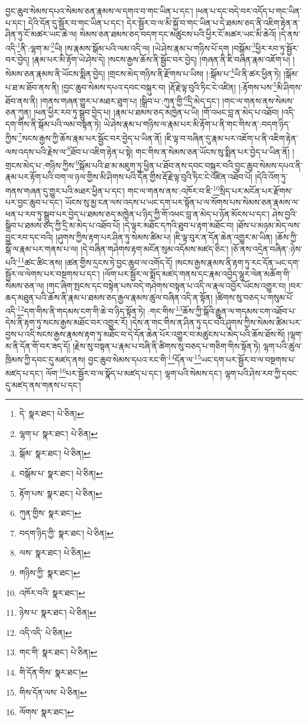 བྱང་ཆུབ་སེམས་དཔའ་སེམས་ཅན་རྣམས་ལ་དགའ་བ་གང་ཡིན་པ་དང་། །ཕན་པ་དང་བདེ་བར་འདོད་པ་གང་ཡིན་པ་དང་། དེའི་དོན་དུ་སྦྱོར་བ་གང་ཡིན་པ་དང་། དེར་སྦྱོར་བ་ལ་མི་སྐྱོ་བ་གང་ཡིན་པ་དེ་ཐམས་ཅད་ནི་འཇིག་རྟེན་ན་ཤིན་ཏུ་ངོ་མཚར་ཡང་ཆེ་ལ། སེམས་ཅན་ཐམས་ཅད་བདག་དང་མཚུངས་པའི་ཕྱིར་ངོ་མཚར་ཡང་མི་ཆེའོ། །དེ་ནས་འདི་\footnote{དེ་  སྣར་ཐང་།  པེ་ཅིན། }ནི་:ལྷག་མ་\footnote{ལྷག་པ་  སྣར་ཐང་།  པེ་ཅིན། }ཡི། །ས་རྣམས་སྒོམ་པའི་ལམ་འདི་ལ། །ཡེ་ཤེས་རྣམ་པ་གཉིས་པོ་དག །བསྒོམ་\footnote{སྒོམ་  སྣར་ཐང་།  པེ་ཅིན། }ཕྱིར་རབ་ཏུ་སྦྱོར་བར་བྱེད། །རྣམ་པར་མི་རྟོག་ཡེ་ཤེས་དེ། །སངས་རྒྱས་ཆོས་ནི་སྦྱོང་བར་བྱེད། །གཞན་ནི་ཇི་བཞིན་རྣམ་འཇོག་པ། །སེམས་ཅན་རྣམས་ནི་ཡོངས་སྨིན་བྱེད། །གྲངས་མེད་གཉིས་ནི་རྫོགས་པ་ཡིས། །:སྒོམ་པ་\footnote{བསྒོམ་པ་  སྣར་ཐང་།  པེ་ཅིན། }ཡི་ནི་ཚར་ཕྱིན་ཏེ། །སྒོམ་པ་ཐ་མ་ཐོབ་ནས་ནི། །བྱང་ཆུབ་སེམས་དཔའ་དབང་བསྐུར་བ། །རྡོ་རྗེ་ལྟ་བུའི་ཏིང་ངེ་འཛིན། །:རྟོགས་པས་\footnote{རྟོག་པས་  སྣར་ཐང་།  པེ་ཅིན། }མི་ཤིགས་ཐོབ་ནས་ནི། །གནས་གཞན་གྱུར་པ་མཐར་ཐུག་པ། །སྒྲིབ་པ་:ཀུན་གྱི་\footnote{ཀུན་གྱིས་  སྣར་ཐང་། }དྲི་མེད་དང་། །གང་ལ་གནས་ནས་སེམས་ཅན་ཀུན། །ཕན་ཕྱིར་རབ་ཏུ་སྒྲུབ་བྱེད་པ། །རྣམ་པ་ཐམས་ཅད་མཁྱེན་པ་ཡི། །གོ་འཕང་བླ་ན་མེད་པ་འཐོབ། །འདི་དག་གིས་ནི་སྒོམ་པའི་ལམ་བསྟན་ཏེ། ཡེ་ཤེས་རྣམ་པ་གཉིས་ལ་རྣམ་པར་མི་རྟོག་པ་ནི་གང་གིས་ན་:བདག་ཉིད་ཀྱིས་\footnote{བདག་ཉིད་ཀྱི་  སྣར་ཐང་།  པེ་ཅིན། }སངས་རྒྱས་ཀྱི་ཆོས་རྣམ་པར་སྦྱོང་བར་བྱེད་པ་ཡིན་ནོ། །ཇི་ལྟ་བ་བཞིན་དུ་རྣམ་པར་འཇོག་པ་ནི་འཇིག་རྟེན་ལས་འདས་པའི་རྗེས་ལ་\footnote{ལས་  སྣར་ཐང་།  པེ་ཅིན། }ཐོབ་པ་འཇིག་རྟེན་པ་སྟེ། གང་གིས་ན་སེམས་ཅན་ཡོངས་སུ་སྨིན་པར་བྱེད་པ་ཡིན་ནོ། །གྲངས་མེད་པ་:གཉིས་ཀྱིས་\footnote{གཉིས་ཀྱི་  སྣར་ཐང་། }སྒོམ་པའི་ཐ་མ་མཇུག་ཏུ་ཕྱིན་པ་ཐོབ་ནས་དབང་བསྐུར་བའི་བྱང་ཆུབ་སེམས་དཔའ་ནི་རྣམ་པར་རྟོག་པའི་བག་ལ་ཉལ་གྱིས་མི་ཤིགས་པའི་དོན་གྱིས་རྡོ་རྗེ་ལྟ་བུའི་ཏིང་ངེ་འཛིན་འཐོབ་པོ། །དེའི་འོག་ཏུ་གནས་གཞན་དུ་གྱུར་པའི་མཐར་ཕྱིན་པ་དང་། གང་ལ་གནས་ནས་:འཁོར་བ་ཇི་\footnote{འཁོར་བའི་  སྣར་ཐང་། }སྲིད་པར་མངོན་པར་རྫོགས་པར་བྱང་ཆུབ་པ་དང་། ཡོངས་སུ་མྱ་ངན་ལས་འདས་པ་ཡང་དག་པར་སྟོན་པ་ལ་སོགས་པས་སེམས་ཅན་རྣམས་ལ་ཕན་པ་རབ་ཏུ་སྒྲུབ་པར་བྱེད་པ་ཐམས་ཅད་མཁྱེན་པ་ཉིད་ཀྱི་གོ་འཕང་བླ་ན་མེད་པ་ཉོན་མོངས་པ་དང་། ཤེས་བྱའི་སྒྲིབ་པ་ཐམས་ཅད་ཀྱི་དྲི་མ་མེད་པ་འཐོབ་པོ། །དེ་ལྟར་མཐོང་དཀའི་ཐུབ་པ་རྟག་མཐོང་བ། །ཐོས་པ་མཉམ་མེད་ལས་བྱུང་རབ་དང་བའི། །ཤུགས་ཀྱིས་རྟག་པར་ཤིན་ཏུ་སེམས་ཚིམ་པ། །ཇི་ལྟ་བུར་ན་དོན་ཆེན་འགྱུར་མ་ཡིན། །ཆོས་ཀྱི་སྒོ་ལ་རྣམ་པར་གནས་པ་ལ། །དེ་བཞིན་གཤེགས་རྟག་མངོན་སུམ་འདོམས་མཛད་ཅིང་། །ཅོ་ནས་འདྲེན་བཞིན་:ཉེས་པའི་\footnote{ཉེས་པ་  སྣར་ཐང་།  པེ་ཅིན། }ཚང་ཚིང་ནས། །ཚན་གྱིས་དྲངས་ཏེ་བྱང་ཆུབ་ལ་འགོད་དོ། །སངས་རྒྱས་རྣམས་ནི་རྟག་ཏུ་རང་དོན་ཡང་དག་སྦྱོར་ལ་ལེགས་པར་བསྔགས་པ་དང་། །ལོག་པར་སྦྱོར་ལ་སྨོད་མཛད་གནས་དང་རྣམ་འབྱེད་ལྷུར་ལེན་མཆོག་གི་སེམས་ཅན་ལ། །གང་ཞིག་སྤངས་དང་བསྟེན་པས་བདེ་གཤེགས་བསྟན་པ་འདི་ལ་རྣལ་འབྱོར་ཡོངས་འགྱུར་བ། །བར་ཆད་མཐུན་པའི་ཆོས་ནི་རྣམ་པ་ཐམས་ཅད་རྒྱལ་རྣམས་ཚུལ་བཞིན་འདི་ན་སྟོན། །ཚིགས་སུ་བཅད་པ་གསུམ་པོ་འདི་\footnote{འདི་འདི་  པེ་ཅིན། }དག་གིས་ནི་གདམས་ངག་གི་ཆེ་བ་ཉིད་སྟོན་ཏེ། :གང་གིས་\footnote{གང་གི་  སྣར་ཐང་།  པེ་ཅིན། }ཆོས་ཀྱི་སྒོའི་རྒྱུན་ལ་གདམས་ངག་འཐོབ་པ་དེས་ནི་རྟག་ཏུ་སངས་རྒྱས་མཐོང་བར་འགྱུར་རོ། །དེས་ན་གང་གིས་ན་ཤིན་ཏུ་དང་བའི་ཤུགས་ཀྱིས་སེམས་ཚིམ་པར་བྱས་པ་འདི་སངས་རྒྱས་རྣམས་རྟག་ཏུ་མཐོང་བ་དེ་དོན་ཆེན་པོར་འགྱུར་བ་མཚུངས་པ་མེད་པའི་ཆོས་ཐོས་སོ། །ལྷག་མ་ནི་དོན་གོ་བར་ཟད་དོ། །རྗེས་སུ་བསྟན་པ་རྣམ་པ་བཞི་ནི་ཚིགས་སུ་བཅད་པ་གཅིག་གིས་སྟོན་ཏེ། ལྷག་པའི་ཚུལ་ཁྲིམས་ཀྱི་དབང་དུ་མཛད་ནས། བྱང་ཆུབ་སེམས་དཔའ་རང་གི་\footnote{གི་དོན་གིས་  སྣར་ཐང་། }དོན་ལ་\footnote{གིས་དོན་ལས་  པེ་ཅིན། }ཡང་དག་པར་སྦྱོར་བ་ལ་བསྔགས་པ་མཛད་པ་དང་། ལོག་\footnote{ལོགས་  སྣར་ཐང་། }པར་སྦྱོར་བ་ལ་སྣོད་པ་མཛད་པ་དང་། ལྷག་པའི་སེམས་དང་། ལྷག་པའི་ཤེས་རབ་ཀྱི་དབང་དུ་མཛད་ནས་གནས་པ་དང་། 
